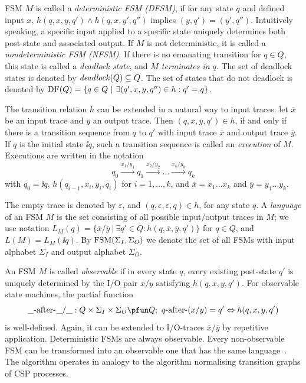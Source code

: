 FSM $M$ is called a \emph{deterministic FSM (DFSM)}, if for any state $q$ and defined input $x$,
$h(q,x,y,q') \wedge h(q,x,y',q'')$ implies $(y,q') = (y',q'')$. Intuitively speaking, a specific
input applied to a specific state uniquely determines both post-state and associated output.
If $M$ is not deterministic, it is called a \emph{nondeterministic FSM (NFSM)}.
If there is no emanating transition for $q\in Q$, this state is called a \emph{deadlock state}, and
\emph{$M$ terminates in $q$}. The set of deadlock states is denoted by ${\it deadlock}(Q)\subseteq Q$.
The set of states that do not deadlock is denoted by
$\text{DF}(Q) = \{ q\in Q~|~\exists (q',x,y,q'')\in h: q' = q \}$.


The transition relation $h$ can be extended in a natural way to input traces:
let $\overline{x}$ be an input trace and $\overline{y}$ an output trace. Then
$(q,\overline{x},\overline{y},q')\in h$, if and only if there is a transition sequence
from $q$ to $q'$ with input trace $\overline{x}$ and output trace $\overline{y}$.
If $q$ is the initial state $\ii{q}$, such a transition sequence is called an \emph{execution} of $M$. Executions are written in the notation
$$
q_0 \xrightarrow{x_1/y_1} q_1 \xrightarrow{x_2/y_2} \dots \xrightarrow{x_{k}/y_{k}} q_{k}
$$
with $q_0 = \ii{q}$, $h(q_{i-1},x_i,y_i,q_{i})$ for $i = 1,\dots,k$, and
$\overline{x} = x_1\dots x_k$ and $\overline{y} = y_1\dots y_k$.

The empty trace is denoted by $\varepsilon$, and
$(q,\varepsilon,\varepsilon,q)\in h$, for any state $q$.
A \emph{language}  of an FSM $M$  is the set consisting of all possible input/output
traces in $M$; we use notation
 $L_M(q)=\{\overline{x}/\overline{y}~|~\exists q'\in Q: h(q,\overline{x},\overline{y},q')\}$ for $q\in Q$, and  $L(M)=L_M(\ii{q})$.
By $\text{FSM}(\Sigma_I,\Sigma_O)$ we denote the set of all FSMs with input alphabet $\Sigma_I$ and
output alphabet $\Sigma_O$.

An FSM $M$ is called \emph{observable} if in every state $q$, every existing post-state $q'$ is uniquely determined by the I/O pair $x/y$ satisfying $h(q,x,y,q')$. For
observable state machines, the partial function
$$
\_ \after\_ /\_ : Q\times\Sigma_I\times \Sigma_O \pfun Q;\
q\after(x/y) = q' \Leftrightarrow h(q,x,y,q')
$$
is well-defined. Again, it can be extended to I/O-traces $\overline x/\overline y$
by repetitive application.
Deterministic FSMs are always observable. Every non-observable FSM can be transformed into an observable one that has the same language~\cite{PeleskaHuangLectureNotesMBT}. The algorithm
operates in analogy to the algorithm normalising transition graphs of CSP processes.

